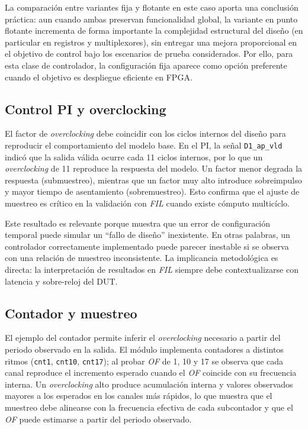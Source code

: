 La comparación entre variantes fija y flotante en este caso aporta una conclusión práctica: aun cuando ambas preservan funcionalidad global, la variante en punto flotante incrementa de forma importante la complejidad estructural del diseño (en particular en registros y multiplexores), sin entregar una mejora proporcional en el objetivo de control bajo los escenarios de prueba considerados. Por ello, para esta clase de controlador, la configuración fija aparece como opción preferente cuando el objetivo es despliegue eficiente en FPGA.

\subsection{Control PI y overclocking}
El factor de \textit{overclocking} debe coincidir con los ciclos internos del diseño para reproducir el comportamiento del modelo base. En el PI, la señal \texttt{D1\_ap\_vld} indicó que la salida válida ocurre cada 11 ciclos internos, por lo que un \textit{overclocking} de 11 reproduce la respuesta del modelo. Un factor menor degrada la respuesta (submuestreo), mientras que un factor muy alto introduce sobreimpulso y mayor tiempo de asentamiento (sobremuestreo). Esto confirma que el ajuste de muestreo es crítico en la validación con \textit{FIL} cuando existe cómputo multicíclo.

Este resultado es relevante porque muestra que un error de configuración temporal puede simular un ``fallo de diseño'' inexistente. En otras palabras, un controlador correctamente implementado puede parecer inestable si se observa con una relación de muestreo inconsistente. La implicancia metodológica es directa: la interpretación de resultados en \textit{FIL} siempre debe contextualizarse con latencia y sobre-reloj del DUT.

\subsection{Contador y muestreo}
El ejemplo del contador permite inferir el \textit{overclocking} necesario a partir del periodo observado en la salida. El módulo implementa contadores a distintos ritmos (\texttt{cnt1}, \texttt{cnt10}, \texttt{cnt17}); al probar \textit{OF} de 1, 10 y 17 se observa que cada canal reproduce el incremento esperado cuando el \textit{OF} coincide con su frecuencia interna. Un \textit{overclocking} alto produce acumulación interna y valores observados mayores a los esperados en los canales más rápidos, lo que muestra que el muestreo debe alinearse con la frecuencia efectiva de cada subcontador y que el \textit{OF} puede estimarse a partir del periodo observado.

